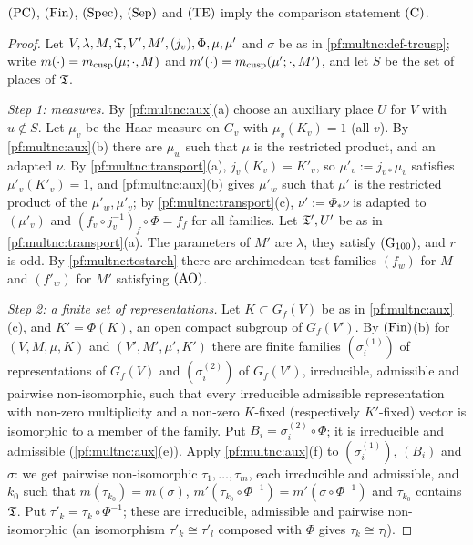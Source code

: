 \begin{theorem}\label{pf:multnc:trcusp-steps}
$\textup{(PC)}$, $\textup{(Fin)}$, $\textup{(Spec)}$, $\textup{(Sep)}$ and $\textup{(TE)}$ imply the comparison
statement $\textup{(C)}$.
\end{theorem}

\begin{proof}
Let $V,\lambda,M,\mathfrak{T},V',M',(j_v),\Phi,\mu,\mu'$ and $\sigma$ be as in \cref{pf:multnc:def-trcusp}; write
$m(\cdot)=m_{\mathrm{cusp}}(\mu;\cdot,M)$ and $m'(\cdot)=m_{\mathrm{cusp}}(\mu';\cdot,M')$, and let $S$ be the set of places of $\mathfrak{T}$.

\emph{Step 1: measures.} By \cref{pf:multnc:aux}(a) choose an auxiliary place $U$ for $V$ with $u\notin S$. Let $\mu_v$
be the Haar measure on $G_v$ with $\mu_v(K_v)=1$ (all $v$). By \cref{pf:multnc:aux}(b) there are $\mu_w$ such that $\mu$
is the restricted product, and an adapted $\nu$. By \cref{pf:multnc:transport}(a), $j_v(K_v)=K'_v$, so
$\mu'_v:=j_{v*}\mu_v$ satisfies $\mu'_v(K'_v)=1$, and \cref{pf:multnc:aux}(b) gives $\mu'_w$ such that $\mu'$ is the
restricted product of the $\mu'_w,\mu'_v$; by \cref{pf:multnc:transport}(c), $\nu':=\Phi_*\nu$ is adapted to $(\mu'_v)$ and
$(f_v\circ j_v^{-1})_f\circ\Phi=f_f$ for all families. Let $\mathfrak{T}',U'$ be as in \cref{pf:multnc:transport}(a). The
parameters of $M'$ are $\lambda$, they satisfy $\textup{(G$_{100}$)}$, and $r$ is odd. By \cref{pf:multnc:testarch} there
are archimedean test families $(f_w)$ for $M$ and $(f'_w)$ for $M'$ satisfying $\textup{(AO)}$.

\emph{Step 2: a finite set of representations.} Let $K\subset G_f(V)$ be as in \cref{pf:multnc:aux}(c), and $K'=\Phi(K)$,
an open compact subgroup of $G_f(V')$. By $\textup{(Fin)}$(b) for $(V,M,\mu,K)$ and $(V',M',\mu',K')$ there are finite
families $(\sigma^{(1)}_i)$ of representations of $G_f(V)$ and $(\sigma^{(2)}_i)$ of $G_f(V')$, irreducible, admissible and
pairwise non-isomorphic, such that every irreducible admissible representation with non-zero multiplicity and a non-zero
$K$-fixed (respectively $K'$-fixed) vector is isomorphic to a member of the family. Put $B_i=\sigma^{(2)}_i\circ\Phi$; it is
irreducible and admissible (\cref{pf:multnc:aux}(e)). Apply \cref{pf:multnc:aux}(f) to $(\sigma^{(1)}_i)$, $(B_i)$ and
$\sigma$: we get pairwise non-isomorphic $\tau_1,\dots,\tau_m$, each irreducible and admissible, and $k_0$ such that
$m(\tau_{k_0})=m(\sigma)$, $m'(\tau_{k_0}\circ\Phi^{-1})=m'(\sigma\circ\Phi^{-1})$ and $\tau_{k_0}$ contains $\mathfrak{T}$.
Put $\tau'_k=\tau_k\circ\Phi^{-1}$; these are irreducible, admissible and pairwise non-isomorphic (an isomorphism
$\tau'_k\cong\tau'_l$ composed with $\Phi$ gives $\tau_k\cong\tau_l$).


\end{proof}
